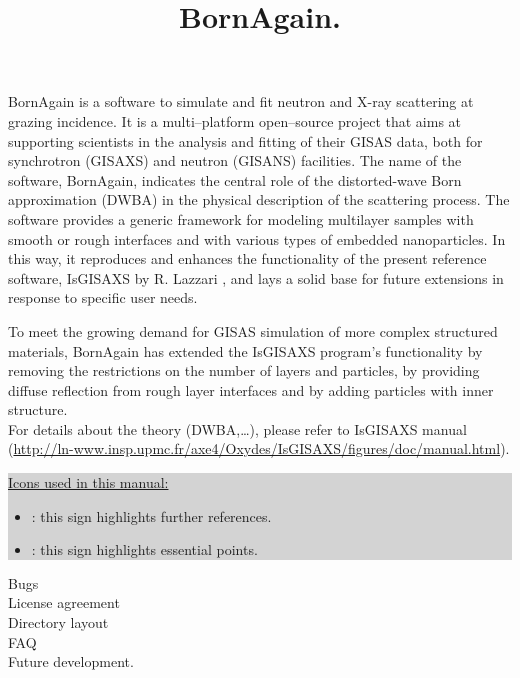\documentclass[a4paper,10pt]{report}
\title{BornAgain. }
\author{}
\newcommand\BackgroundPic{%
\put(0,0){%
\parbox[b][\paperheight]{\paperwidth}{%
\vfill
\centering
\texttt{[image: results2\_2.png]}%
\vfill
}}}
\begin{document}
\maketitle



\tableofcontents
\lstlistoflistings
\listoffigures
\listoftables

\newpage

BornAgain is a  software to simulate and fit neutron and X-ray
scattering at grazing incidence. It is a multi–platform open–source project that aims at supporting scientists in the analysis and fitting
of their GISAS data, both for synchrotron (GISAXS) and neutron (GISANS) facilities. The name of the software,
BornAgain, indicates the central role of the distorted-wave Born
approximation (DWBA) in the physical description of the
scattering process. The software provides a generic framework for modeling multilayer samples with smooth or
rough interfaces and with various types of embedded nanoparticles. In this way, it reproduces and enhances the
functionality of the present reference software, IsGISAXS by
R. Lazzari \cite{Lazzari:vi0158}, and lays a solid base for future
extensions in response to specific user needs. 

To meet the growing demand for GISAS simulation of more
complex structured materials, BornAgain has extended the IsGISAXS program’s functionality by removing the
restrictions on the number of layers and particles, by providing diffuse reflection from rough layer interfaces and
by adding particles with inner structure. \\


For details about the theory (DWBA,\ldots), please refer to IsGISAXS manual (\url{http://ln-www.insp.upmc.fr/axe4/Oxydes/IsGISAXS/figures/doc/manual.html}).\\


\colorbox{Lightgray}{\parbox{\linewidth-8\fboxsep}
{\noindent \underline{Icons used in this manual:}
\begin{itemize}
\item[] \smallpencil: this sign highlights further references.
\item[] {\huge\danger}: this sign highlights essential points.
\end{itemize}}}



%
%
%
%


Bugs\\ License agreement\\ Directory layout \\ FAQ \\ Future development.
%





\end{document}
